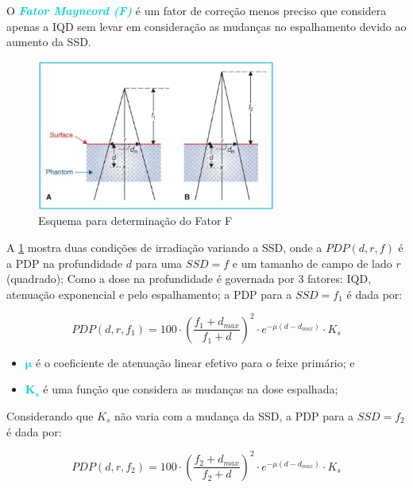 \documentclass[11pt,a4paper]{article}
\newcounter{exemplo}
\begin{document}
	O \textcolor{DarkTurquoise}{\textbf{\textit{Fator Mayneord (F)}}} é um fator de correção menos preciso que considera apenas a IQD sem levar em consideração as mudanças no espalhamento devido ao aumento da SSD.

	\begin{figure}[h]
		\centering
		\includegraphics[width=0.7\textwidth]{Imagens/fatorF.JPG}
		\caption{Esquema para determinação do Fator F}
		\label{fig:fatorF}
	\end{figure}
	
	A \ref{fig:fatorF} mostra duas condições de irradiação variando a SSD, onde a $PDP(d,r,f)$ é a PDP na profundidade $d$ para uma $SSD = f$ e um tamanho de campo de lado $r$ (quadrado); Como a dose na profundidade é governada por 3 fatores: IQD, atenuação exponencial e pelo espalhamento; a PDP  para a $SSD = f_1$ é dada por:
	
		\begin{equation}
			PDP(d, r, f_1) = 100 \cdot \left(\frac{f_1 + d_{max}}{f_1 + d}\right)^2 \cdot e^{-\mu (d - d_{max})} \cdot K_s
			\label{eq:pdpParaSSD1}
		\end{equation}
	
	\begin{exemplo}[onde:]
		\begin{itemize}
			\item \textcolor{DarkTurquoise}{$\mathbf{\mu}$} é o coeficiente de atenuação linear efetivo para o feixe primário; e
			\item \textcolor{DarkTurquoise}{$\mathbf{K_s}$} é uma função que considera as mudanças na dose espalhada;
		\end{itemize}
	\end{exemplo}

	Considerando que $K_s$ não varia com a mudança da SSD, a PDP para a $SSD = f_2$ é dada por:

	\begin{equation}
		PDP(d, r, f_2) = 100 \cdot \left(\frac{f_2 + d_{max}}{f_2 + d}\right)^2 \cdot e^{-\mu (d - d_{max})} \cdot K_s
		\label{eq:pdpParaSSD2}
	\end{equation}
\end{document}
